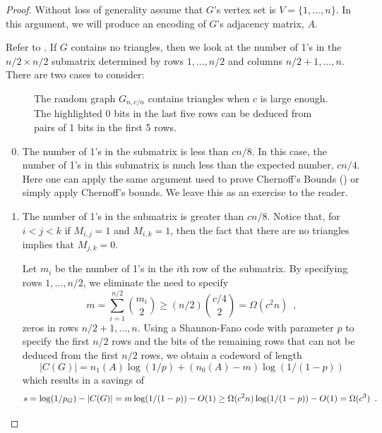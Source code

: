 \documentclass{patmorin}
\begin{document}
\begin{proof}
  Without loss of generality assume that $G$'s vertex set is
  $V=\{1,\ldots,n\}$.  In this argument, we will produce an encoding
  of $G$'s adjacency matrix, $A$.

  Refer to .  If $G$ contains no triangles, then we
  look at the number of 1's in the $n/2\times n/2$ submatrix
  determined by rows $1,\ldots,n/2$ and columns $n/2+1,\ldots,n$.
  There are two cases to consider:
  
  \begin{figure}
    \caption{The random graph $G_{n,c/n}$ contains triangles when $c$
      is large enough.  The highlighted 0 bits in the last five rows
      can be deduced from pairs of 1 bits in the first 5 rows.}
  \end{figure}

  \begin{enumerate}\setcounter{enumi}{-1}
  \item The number of 1's in the submatrix is less than $cn/8$.  In
    this case, the number of 1's in this submatrix is much less than
    the expected number, $cn/4$.  Here one can apply the same argument
    used to prove Chernoff's Bounds () or simply
    apply Chernoff's bounds. We leave this as an exercise to the
    reader.

  \item The number of 1's in the submatrix is greater than $cn/8$.
    Notice that, for $i<j<k$ if $M_{i,j}=1$ and $M_{i,k}=1$, then the
    fact that there are no triangles implies that $M_{j,k}=0$.

    Let $m_i$ be the number of 1's in the $i$th row of the submatrix.
    By specifying rows $1,\ldots,n/2$, we eliminate the need to
    specify
    \[
    m = \sum_{i=1}^{n/2}\binom{m_i}{2} \ge (n/2)\binom{c/4}{2} =
    \Omega(c^2n) \enspace ,
    \]
    zeros in rows $n/2+1,\ldots,n$.  Using a Shannon-Fano code with
    parameter $p$ to specify the first $n/2$ rows and the bits of the
    remaining rows that can not be deduced from the first $n/2$ rows,
    we obtain a codeword of length
    \[
    |C(G)| = n_1(A) \log(1/p) + (n_0(A)-m)\log(1/(1-p))
    \]
    which results in a savings of
    \[
    s = \log(1/p_G) - |C(G)| = m\log(1/(1-p)) -O(1) \ge
    \Omega(c^2n)\log(1/(1-p)) - O(1) = \Omega(c^3) \enspace . \qedhere
    \]
  \end{enumerate}
\end{proof}
\end{document}
